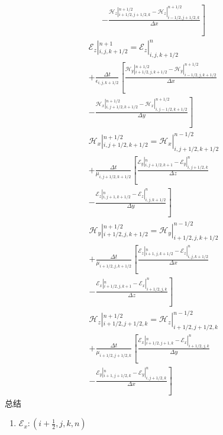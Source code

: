 \documentclass{article}
\newcommand{\nobracket}{}
\begin{document}
\begin{CJK*}{UTF8}{gbsn}
\[\begin{array}{l}
     \left. - \frac{\nobracket \mathscr{H}_z |_{i + 1 / 2, j + 1 / 2, k}^{n +
     1 / 2} - \nobracket \mathscr{H}_z |_{i - 1 / 2, j + 1 / 2, k}^{n + 1 /
     2}}{\Delta x} \right]
   \end{array} \]
\[ \begin{array}{l}
     \nobracket \mathscr{E}_z |_{i, j, k + 1 / 2}^{n + 1} = \nobracket
     \mathscr{E}_z |_{i, j, k + 1 / 2}^n\\
     + \frac{\Delta t}{\epsilon_{i, j, k + 1 / 2}} \left[ \frac{\nobracket
     \mathscr{H}_y |_{i + 1 / 2, j, k + 1 / 2}^{n + 1 / 2} - \nobracket
     \mathcal{H}_y |_{i - 1 / 2, j, k + 1 / 2}^{n + 1 / 2}}{\Delta x}
     \right.\\
     \left. - \frac{\nobracket \mathscr{H}_x |_{i, j + 1 / 2, k + 1 / 2}^{n +
     1 / 2} - \nobracket \mathscr{H}_x |_{i, j - 1 / 2, k + 1 / 2}^{n + 1 /
     2}}{\Delta y} \right]\\
     \nobracket \mathscr{H}_x |_{i, j + 1 / 2, k + 1 / 2}^{n + 1 / 2} =
     \nobracket \mathscr{H}_x |_{i, j + 1 / 2, k + 1 / 2}^{n - 1 / 2}\\
     + \frac{\Delta t}{\mu_{i, j + 1 / 2, k + 1 / 2}} \left[ \frac{\nobracket
     \mathscr{E}_y |_{i, j + 1 / 2, k + 1}^n - \nobracket \mathscr{E}_y |_{i,
     j + 1 / 2, k}^n}{\Delta z} \right.\\
     \left. - \frac{\nobracket \mathscr{E}_z |_{i, j + 1, k + 1 / 2}^n -
     \nobracket \mathscr{E}_z |_{i, j, k + 1 / 2}^n}{\Delta y} \right]
   \end{array} \]
\[ \begin{array}{l}
     \nobracket \mathscr{H}_y |_{i + 1 / 2, j, k + 1 / 2}^{n + 1 / 2} =
     \nobracket \mathscr{H}_y |_{i + 1 / 2, j, k + 1 / 2}^{n - 1 / 2}\\
     + \frac{\Delta t}{\mu_{i + 1 / 2, j, k + 1 / 2}} \left[ \frac{\nobracket
     \mathscr{E}_z |_{i + 1, j, k + 1 / 2}^n - \nobracket \mathscr{E}_z |_{i,
     j, k + 1 / 2}^n}{\Delta x} \right.\\
     \left. - \frac{\nobracket \mathscr{E}_x |_{i + 1 / 2, j, k + 1}^n -
     \nobracket \mathscr{E}_x |_{i + 1 / 2, j, k}^n}{\Delta z} \right]\\
     \nobracket \mathscr{H}_z |_{i + 1 / 2, j + 1 / 2, k}^{n + 1 / 2} =
     \nobracket \mathscr{H}_z |_{i + 1 / 2, j + 1 / 2, k}^{n - 1 / 2}\\
     + \frac{\Delta t}{\mu_{i + 1 / 2, j + 1 / 2, k}} \left[ \frac{\nobracket
     \mathscr{E}_x |_{i + 1 / 2, j + 1, k}^n - \nobracket \mathscr{E}_x |_{i +
     1 / 2, j, k}^n}{\Delta y} \right.\\
     \left. - \frac{\nobracket \mathscr{E}_y |_{i + 1, j + 1 / 2, k}^n -
     \nobracket \mathscr{E}_y |_{i, j + 1 / 2, k}^n}{\Delta x} \right]
   \end{array} \]
总结
\begin{enumerate}
  \item $\mathscr{E}_x : \left( i + \frac{1}{2}, j, k, n \right)$
  

\end{enumerate}
\end{CJK*}
\end{document}
